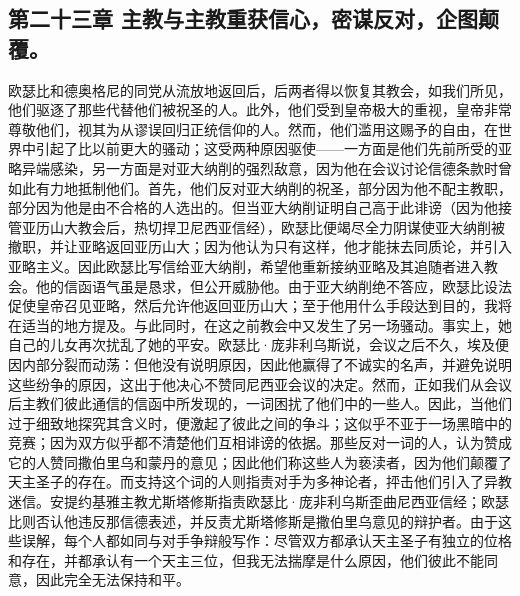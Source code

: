 
\subsection{第二十三章  主教与主教重获信心，密谋反对，企图颠覆。}

欧瑟比和德奥格尼的同党从流放地返回后，后两者得以恢复其教会，如我们所见，他们驱逐了那些代替他们被祝圣的人。此外，他们受到皇帝极大的重视，皇帝非常尊敬他们，视其为从谬误回归正统信仰的人。然而，他们滥用这赐予的自由，在世界中引起了比以前更大的骚动；这受两种原因驱使——一方面是他们先前所受的亚略异端感染，另一方面是对亚大纳削的强烈敌意，因为他在会议讨论信德条款时曾如此有力地抵制他们。首先，他们反对亚大纳削的祝圣，部分因为他不配主教职，部分因为他是由不合格的人选出的。但当亚大纳削证明自己高于此诽谤（因为他接管亚历山大教会后，热切捍卫尼西亚信经），欧瑟比便竭尽全力阴谋使亚大纳削被撤职，并让亚略返回亚历山大；因为他认为只有这样，他才能抹去同质论，并引入亚略主义。因此欧瑟比写信给亚大纳削，希望他重新接纳亚略及其追随者进入教会。他的信函语气虽是恳求，但公开威胁他。由于亚大纳削绝不答应，欧瑟比设法促使皇帝召见亚略，然后允许他返回亚历山大；至于他用什么手段达到目的，我将在适当的地方提及。与此同时，在这之前教会中又发生了另一场骚动。事实上，她自己的儿女再次扰乱了她的平安。欧瑟比·庞非利乌斯说，会议之后不久，埃及便因内部分裂而动荡：但他没有说明原因，因此他赢得了不诚实的名声，并避免说明这些纷争的原因，这出于他决心不赞同尼西亚会议的决定。然而，正如我们从会议后主教们彼此通信的信函中所发现的，一词困扰了他们中的一些人。因此，当他们过于细致地探究其含义时，便激起了彼此之间的争斗；这似乎不亚于一场黑暗中的竞赛；因为双方似乎都不清楚他们互相诽谤的依据。那些反对一词的人，认为赞成它的人赞同撒伯里乌和蒙丹的意见；因此他们称这些人为亵渎者，因为他们颠覆了天主圣子的存在。而支持这个词的人则指责对手为多神论者，抨击他们引入了异教迷信。安提约基雅主教尤斯塔修斯指责欧瑟比·庞非利乌斯歪曲尼西亚信经；欧瑟比则否认他违反那信德表述，并反责尤斯塔修斯是撒伯里乌意见的辩护者。由于这些误解，每个人都如同与对手争辩般写作：尽管双方都承认天主圣子有独立的位格和存在，并都承认有一个天主三位，但我无法揣摩是什么原因，他们彼此不能同意，因此完全无法保持和平。\par


